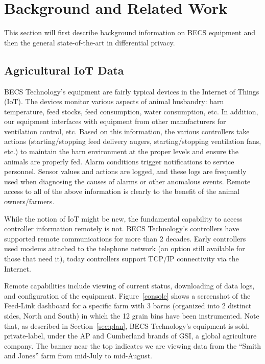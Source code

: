 \section{Background and Related Work}
\label{sec:background}

This section will first describe background information on BECS
equipment and then the general state-of-the-art in differential
privacy.

\subsection{Agricultural IoT Data}
\label{sec:agIoT}

BECS Technology's equipment are fairly typical devices
in the Internet of Things (IoT).
The devices monitor various aspects of animal husbandry:
barn temperature, feed stocks, feed consumption, water consumption, etc.
In addition, our equipment interfaces with equipment from
other manufacturers for ventilation control, etc.
Based on this information, the various controllers take actions
(starting/stopping feed delivery augers, starting/stopping ventilation
fans, etc.) to maintain
the barn environment at the proper levels and ensure the animals are
properly fed.
Alarm conditions trigger notifications to service personnel.
Sensor values and actions are logged,
and these logs are frequently used when diagnosing the causes
of alarms or other anomalous events.
Remote access to all of the above information is
clearly to the benefit of the animal owners/farmers.

While the notion of IoT might be new,
the fundamental capability to access controller information remotely
is not.  BECS Technology's controllers have supported remote communications
for more than 2 decades.
Early controllers used modems attached to the telephone network
(an option still available for those that need it), today
controllers support TCP/IP connectivity via the Internet.

Remote capabilities include viewing of current status, downloading
of data logs, and configuration of the equipment.
Figure~\ref{console} shows a screenshot of the Feed-Link dashboard
for a specific farm with 3 barns (organized into 2 distinct sides, North
and South) in which the 12 grain bins have
been instrumented.
Note that, as described in Section~\ref{sec:plan}, BECS Technology's
equipment is sold, private-label, under the AP and Cumberland brands
of GSI, a global agriculture company.
The banner near the top indicates we are viewing data from the
``Smith and Jones'' farm from mid-July to mid-August.

